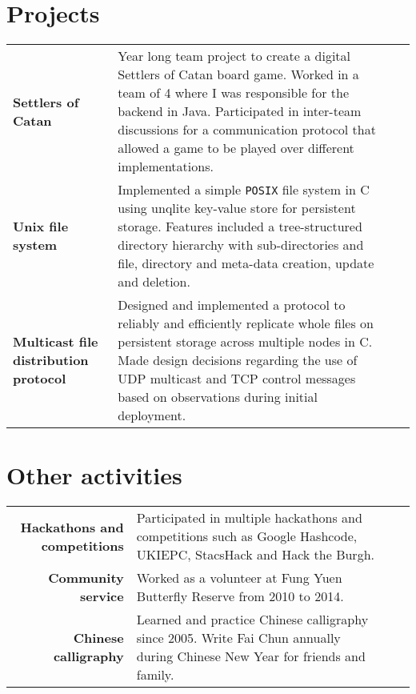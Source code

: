 \documentclass{article}
\newcommand{\n}[0]{\\[\baselineskip]}
\begin{document}
\section*{Projects}
\begin{tabular}{p{4cm}|p{15cm}}
\textbf{Settlers of Catan} & Year long team project to create a digital Settlers of Catan board game. Worked in a team of 4 where I was responsible for the backend in Java. Participated in inter-team discussions for a communication protocol that allowed a game to be played over different implementations. \n

\textbf{Unix file system} & Implemented a simple \texttt{POSIX} file system in C using unqlite key-value store for persistent storage. Features included a tree-structured directory hierarchy with sub-directories and file, directory and meta-data creation, update and deletion.\n

\textbf{Multicast file distribution protocol} & Designed and implemented a protocol to reliably and efficiently replicate whole files on persistent storage across multiple nodes in C. Made design decisions regarding the use of UDP multicast and TCP control messages based on observations during initial deployment.\\


\end{tabular}


\section*{Other activities}
\begin{tabular}{R|p{15cm}}
\textbf{Hackathons and competitions} & Participated in multiple hackathons and competitions such as Google Hashcode, UKIEPC, StacsHack and Hack the Burgh. \n

\textbf{Community service} & Worked as a volunteer at Fung Yuen Butterfly Reserve from 2010 to 2014. \n

\textbf{Chinese calligraphy} & Learned and practice Chinese calligraphy since 2005. Write Fai Chun annually during Chinese New Year for friends and family. 
\end{tabular}
\end{document}
